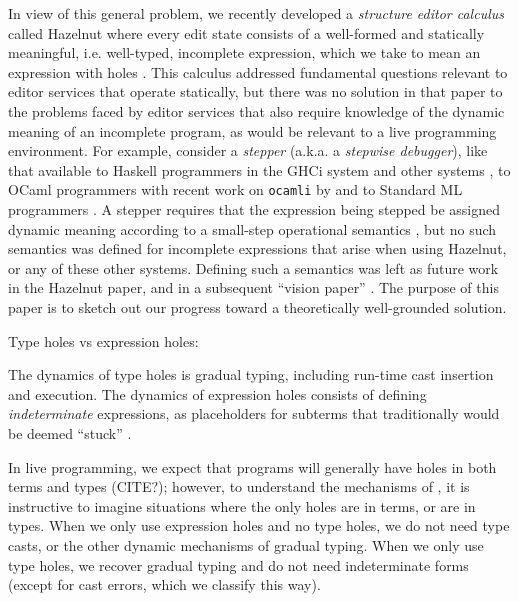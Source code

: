 In view of this general problem, we recently developed a \emph{structure editor calculus} called Hazelnut where every edit state consists of a well-formed and statically meaningful, i.e. well-typed, incomplete expression, which we take to mean an expression with holes \cite{popl-paper}. This calculus addressed fundamental questions relevant to editor services that operate statically, but there was no solution in that paper to the problems faced by editor services that also require knowledge of the dynamic meaning of an incomplete program, as would be relevant to a live programming environment. For example, consider a \emph{stepper} (a.k.a. a \emph{stepwise debugger}), like that available to Haskell programmers in the GHCi system \cite{GHC-stepper} and other systems \cite{DBLP:conf/haskell/MarlowIPG07,kar13566}, to OCaml programmers with recent work on \texttt{ocamli} by \citet{ocaml-stepper} and to Standard ML programmers \cite{DBLP:journals/jfp/TolmachA95}. A stepper requires that the expression being stepped be assigned dynamic meaning according to a small-step operational semantics \cite{DBLP:journals/jlp/Plotkin04a,pfpl}, but no such semantics was defined for incomplete expressions that arise when using Hazelnut, or any of these other systems. Defining such a semantics was left as future work in the Hazelnut paper, and in a subsequent ``vision paper'' \cite{snapl17-paper}. The purpose of this paper is to sketch out our progress toward a theoretically well-grounded solution.


Type holes vs expression holes: 

The dynamics of type holes is gradual typing, including run-time cast
insertion and execution.
%
The dynamics of expression holes consists of defining
\emph{indeterminate} expressions, as placeholders for subterms that
traditionally would be deemed ``stuck'' .

In live programming, we expect that programs will generally have holes
in both terms and types (CITE?); however, to understand the mechanisms
of \HazelnutLive, it is instructive to imagine situations where the
only holes are in terms, or are in types.
%
When we only use expression holes and no type holes, we do not need
type casts, or the other dynamic mechanisms of gradual typing.
% 
When we only use type holes, we recover gradual typing and do not need
indeterminate forms (except for cast errors, which we classify this
way).

